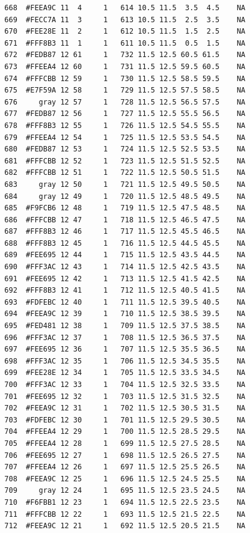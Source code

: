 \documentclass[12pt,twoside]{reedthesis}
\begin{document}
\begin{verbatim}
  668  #FEEA9C 11  4     1   614 10.5 11.5  3.5  4.5    NA
  669  #FECC7A 11  3     1   613 10.5 11.5  2.5  3.5    NA
  670  #FEE28E 11  2     1   612 10.5 11.5  1.5  2.5    NA
  671  #FFF8B3 11  1     1   611 10.5 11.5  0.5  1.5    NA
  672  #FEDB87 12 61     1   732 11.5 12.5 60.5 61.5    NA
  673  #FFEEA4 12 60     1   731 11.5 12.5 59.5 60.5    NA
  674  #FFFCBB 12 59     1   730 11.5 12.5 58.5 59.5    NA
  675  #E7F59A 12 58     1   729 11.5 12.5 57.5 58.5    NA
  676     gray 12 57     1   728 11.5 12.5 56.5 57.5    NA
  677  #FEDB87 12 56     1   727 11.5 12.5 55.5 56.5    NA
  678  #FFF8B3 12 55     1   726 11.5 12.5 54.5 55.5    NA
  679  #FFEEA4 12 54     1   725 11.5 12.5 53.5 54.5    NA
  680  #FEDB87 12 53     1   724 11.5 12.5 52.5 53.5    NA
  681  #FFFCBB 12 52     1   723 11.5 12.5 51.5 52.5    NA
  682  #FFFCBB 12 51     1   722 11.5 12.5 50.5 51.5    NA
  683     gray 12 50     1   721 11.5 12.5 49.5 50.5    NA
  684     gray 12 49     1   720 11.5 12.5 48.5 49.5    NA
  685  #F9FCB6 12 48     1   719 11.5 12.5 47.5 48.5    NA
  686  #FFFCBB 12 47     1   718 11.5 12.5 46.5 47.5    NA
  687  #FFF8B3 12 46     1   717 11.5 12.5 45.5 46.5    NA
  688  #FFF8B3 12 45     1   716 11.5 12.5 44.5 45.5    NA
  689  #FEE695 12 44     1   715 11.5 12.5 43.5 44.5    NA
  690  #FFF3AC 12 43     1   714 11.5 12.5 42.5 43.5    NA
  691  #FEE695 12 42     1   713 11.5 12.5 41.5 42.5    NA
  692  #FFF8B3 12 41     1   712 11.5 12.5 40.5 41.5    NA
  693  #FDFEBC 12 40     1   711 11.5 12.5 39.5 40.5    NA
  694  #FEEA9C 12 39     1   710 11.5 12.5 38.5 39.5    NA
  695  #FED481 12 38     1   709 11.5 12.5 37.5 38.5    NA
  696  #FFF3AC 12 37     1   708 11.5 12.5 36.5 37.5    NA
  697  #FEE695 12 36     1   707 11.5 12.5 35.5 36.5    NA
  698  #FFF3AC 12 35     1   706 11.5 12.5 34.5 35.5    NA
  699  #FEE28E 12 34     1   705 11.5 12.5 33.5 34.5    NA
  700  #FFF3AC 12 33     1   704 11.5 12.5 32.5 33.5    NA
  701  #FEE695 12 32     1   703 11.5 12.5 31.5 32.5    NA
  702  #FEEA9C 12 31     1   702 11.5 12.5 30.5 31.5    NA
  703  #FDFEBC 12 30     1   701 11.5 12.5 29.5 30.5    NA
  704  #FFEEA4 12 29     1   700 11.5 12.5 28.5 29.5    NA
  705  #FFEEA4 12 28     1   699 11.5 12.5 27.5 28.5    NA
  706  #FEE695 12 27     1   698 11.5 12.5 26.5 27.5    NA
  707  #FFEEA4 12 26     1   697 11.5 12.5 25.5 26.5    NA
  708  #FEEA9C 12 25     1   696 11.5 12.5 24.5 25.5    NA
  709     gray 12 24     1   695 11.5 12.5 23.5 24.5    NA
  710  #F6FBB1 12 23     1   694 11.5 12.5 22.5 23.5    NA
  711  #FFFCBB 12 22     1   693 11.5 12.5 21.5 22.5    NA
  712  #FEEA9C 12 21     1   692 11.5 12.5 20.5 21.5    NA

\end{verbatim}
\end{document}

